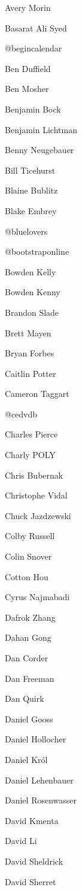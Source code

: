 \begin{DoxyItemize}
\item Avery Morin
\item Basarat Ali Syed
\item @begincalendar
\item Ben Duffield
\item Ben Mosher
\item Benjamin Bock
\item Benjamin Lichtman
\item Benny Neugebauer
\item Bill Ticehurst
\item Blaine Bublitz
\item Blake Embrey
\item @bluelovers
\item @bootstraponline
\item Bowden Kelly
\item Bowden Kenny
\item Brandon Slade
\item Brett Mayen
\item Bryan Forbes
\item Caitlin Potter
\item Cameron Taggart
\item @cedvdb
\item Charles Pierce
\item Charly POLY
\item Chris Bubernak
\item Christophe Vidal
\item Chuck Jazdzewski
\item Colby Russell
\item Colin Snover
\item Cotton Hou
\item Cyrus Najmabadi
\item Dafrok Zhang
\item Dahan Gong
\item Dan Corder
\item Dan Freeman
\item Dan Quirk
\item Daniel Gooss
\item Daniel Hollocher
\item Daniel Król
\item Daniel Lehenbauer
\item Daniel Rosenwasser
\item David Kmenta
\item David Li
\item David Sheldrick
\item David Sherret

\end{DoxyItemize}
